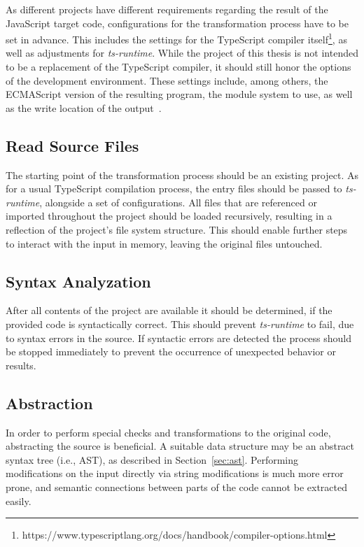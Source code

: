 As different projects have different requirements regarding the result of the JavaScript target code, configurations for the transformation process have to be set in advance. This includes the settings for the TypeScript compiler itself\footnote{https://www.typescriptlang.org/docs/handbook/compiler-options.html}, as well as adjustments for \emph{ts-runtime}. While the project of this thesis is not intended to be a replacement of the TypeScript compiler, it should still honor the options of the development environment. These settings include, among others, the ECMAScript version of the resulting program, the module system to use, as well as the write location of the output~\cite{TypeScriptHandbook:CompilerOptions}.

\subsection{Read Source Files}

The starting point of the transformation process should be an existing project. As for a usual TypeScript compilation process, the entry files should be passed to \emph{ts-runtime}, alongside a set of configurations. All files that are referenced or imported throughout the project should be loaded recursively, resulting in a reflection of the project's file system structure. This should enable further steps to interact with the input in memory, leaving the original files untouched.

\subsection{Syntax Analyzation}

After all contents of the project are available it should be determined, if the provided code is syntactically correct. This should prevent \emph{ts-runtime} to fail, due to syntax errors in the source. If syntactic errors are detected the process should be stopped immediately to prevent the occurrence of unexpected behavior or results.

\subsection{Abstraction}

In order to perform special checks and transformations to the original code, abstracting the source is beneficial. A suitable data structure may be an abstract syntax tree (i.e., AST), as described in Section~\ref{sec:ast}. Performing modifications on the input directly via string modifications is much more error prone, and semantic connections between parts of the code cannot be extracted easily.

